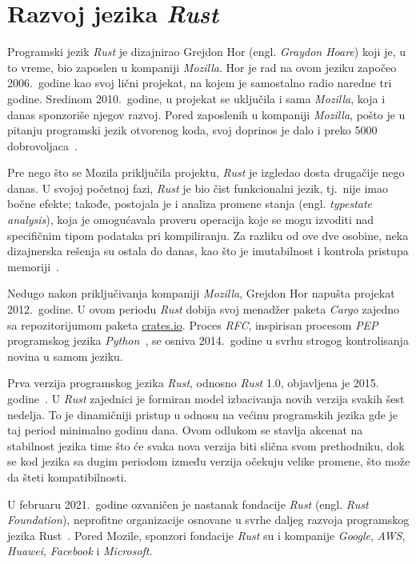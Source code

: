 \documentclass[12pt,oneside]{memoir}
\begin{document}
\section{Razvoj jezika \emph{Rust}}
Programski jezik \emph{Rust} je dizajnirao Grejdon Hor
(engl. \emph{Graydon Hoare}) koji je, u to vreme, bio zaposlen u kompaniji
\textit{Mozilla}.
Hor je rad na ovom jeziku započeo 2006.\ godine kao svoj lični projekat,
na kojem je samostalno radio naredne tri godine.
Sredinom 2010.\ godine, u projekat se
uključila i sama \textit{Mozilla}, koja i danas sponzoriše njegov razvoj.
Pored zaposlenih u kompaniji \textit{Mozilla},
pošto je u pitanju programski jezik otvorenog koda,
svoj doprinos je dalo i preko 5000 dobrovoljaca~\cite{thanks_rust}.

Pre nego što se Mozila priključila projektu, \emph{Rust} je izgledao dosta
drugačije nego danas. U svojoj početnoj fazi, \emph{Rust} je bio čist funkcionalni jezik,
tj.\ nije imao bočne efekte; takođe, postojala je i analiza promene stanja
(engl. \emph{typestate analysis}), koja je omogućavala proveru operacija
koje se mogu izvoditi nad specifičnim tipom podataka pri kompiliranju. Za
razliku od ove dve osobine, neka dizajnerska rešenja su ostala do danas, kao
što je imutabilnost i kontrola pristupa memoriji~\cite{history_rust}.

Nedugo nakon priključivanja kompaniji \textit{Mozilla}, Grejdon Hor napušta projekat
2012.\ godine. U ovom periodu \emph{Rust} dobija svoj menadžer
paketa \emph{Cargo} zajedno sa repozitorijumom paketa \url{crates.io}.
Proces \emph{RFC}, inspirisan procesom \emph{PEP} programskog jezika
\emph{Python}~\cite{python_pep}, se
osniva 2014.\ godine u svrhu strogog kontrolisanja novina u samom jeziku.

Prva verzija programskog jezika \emph{Rust}, odnosno \emph{Rust} 1.0, objavljena je 2015.
godine~\cite{stable_rust}. U \emph{Rust} zajednici je formiran model izbacivanja novih
verzija svakih šest nedelja. To je dinamičniji pristup
u odnosu na većinu programskih jezika gde je taj period minimalno godinu dana.
Ovom odlukom se stavlja akcenat na stabilnost jezika time što će svaka nova
verzija biti slična svom prethodniku, dok se kod jezika sa dugim periodom
između verzija očekuju velike promene, što može da šteti kompatibilnosti.

U februaru 2021.\ godine ozvaničen je nastanak fondacije \emph{Rust} (engl.
\textit{Rust Foundation}), neprofitne organizacije osnovane u svrhe daljeg razvoja programskog
jezika Rust~\cite{rust_foundation}. Pored Mozile, sponzori fondacije \emph{Rust} su i kompanije
\emph{Google}, \emph{AWS}, \emph{Huawei}, \emph{Facebook} i \emph{Microsoft}.
\end{document}
